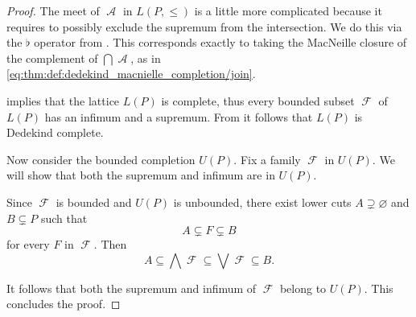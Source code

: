 \begin{proof}
  The meet of \( \mscrA \) in \( L(P, \leq) \) is a little more complicated because it requires to possibly exclude the supremum from the intersection. We do this via the \( \flat \) operator from .  This corresponds exactly to taking the MacNeille closure of the complement of \( \bigcap \mscrA \), as in \eqref{eq:thm:def:dedekind_macnielle_completion/join}.

    implies that the lattice \( L(P) \) is complete, thus every bounded subset \( \mscrF \) of \( L(P) \) has an infimum and a supremum. From  it follows that \( L(P) \) is Dedekind complete.

  Now consider the bounded completion \( U(P) \). Fix a family \( \mscrF \) in \( U(P) \). We will show that both the supremum and infimum are in \( U(P) \).

  Since \( \mscrF \) is bounded and \( U(P) \) is unbounded, there exist lower cuts \( A \supsetneq \varnothing \) and \( B \subsetneq P \) such that
  \begin{equation*}
    A \subsetneq F \subsetneq B
  \end{equation*}
  for every \( F \) in \( \mscrF \). Then
  \begin{equation*}
    A \subseteq \bigwedge \mscrF \subseteq \bigvee \mscrF \subseteq B.
  \end{equation*}

  It follows that both the supremum and infimum of \( \mscrF \) belong to \( U(P) \). This concludes the proof.
\end{proof}
